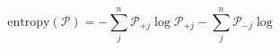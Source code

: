 \begin{equation}
\text{entropy}(\mathcal P) = -\sum_j^n\mathcal P_{+j}\log\mathcal P_{+j} -\sum_j^n\mathcal P_{-j}\log 
\end{equation}